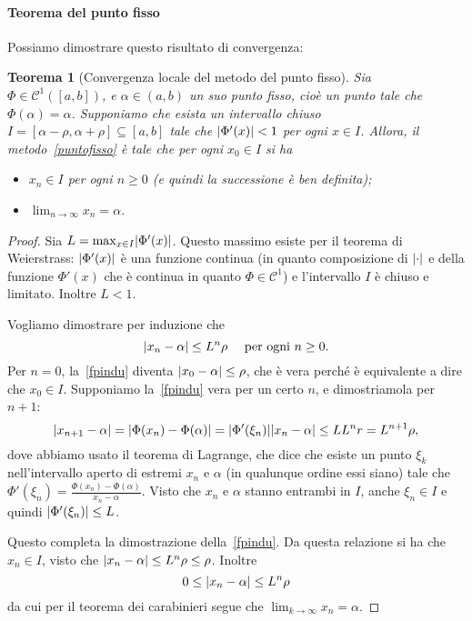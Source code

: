 \documentclass[a4paper]{report}
\DeclarePairedDelimiter{\abs}{\lvert}{\rvert}
\newtheorem{theorem}{Teorema}[chapter]
\theoremstyle{definiton}
\theoremstyle{remark}
\begin{document}
\paragraph{Teorema del punto fisso} Possiamo dimostrare questo risultato di convergenza:
\begin{theorem}[Convergenza locale del metodo del punto fisso] \label{thm:puntofisso}
Sia $\Phi \in \mathcal{C}^1([a,b])$, e $\alpha \in (a,b)$ un suo \emph{punto fisso}, cioè un punto tale che $\Phi(\alpha) = \alpha$. Supponiamo che esista un intervallo chiuso $I = [\alpha-\rho, \alpha+\rho] \subseteq [a,b]$ tale che $\abs{\Phi'(x)} < 1$ per ogni $x \in I$. Allora, il metodo~\eqref{puntofisso} è tale che per ogni $x_0 \in I$ si ha
\begin{itemize}
    \item $x_n \in I$ per ogni $n \geq 0$ (e quindi la successione è ben definita);
    \item $\lim_{n\to\infty} x_n = \alpha$.
\end{itemize}
\end{theorem}


\begin{proof}
Sia $L = \max_{x\in I} \abs{\Phi'(x)}$. Questo massimo esiste per il teorema di Weierstrass: $\abs{\Phi'(x)}$ è una funzione continua (in quanto composizione di $\abs{\cdot}$ e della funzione $\Phi'(x)$ che è continua in quanto $\Phi \in \mathcal{C}^1$) e l'intervallo $I$ è chiuso e limitato. Inoltre $L<1$.

Vogliamo dimostrare per induzione che 
\begin{equation} \label{fpindu}
    \abs{x_n - \alpha} \leq L^n \rho \quad \text{ per ogni $n \geq 0$}.    
\end{equation}
Per $n=0$, la~\eqref{fpindu} diventa $\abs{x_0 - \alpha} \leq \rho$, che è vera perché è equivalente a dire che $x_0 \in I$. Supponiamo la~\eqref{fpindu} vera per un certo $n$, e dimostriamola per $n+1$:
\begin{equation} \label{fpindu2}
    \abs{x_{n+1} - \alpha} = \abs{\Phi(x_n) - \Phi(\alpha)} = \abs{\Phi'(\xi_n)} \abs{x_n - \alpha} \leq L L^n r = L^{n+1}\rho,    
\end{equation}
dove abbiamo usato il teorema di Lagrange, che dice che esiste un punto $\xi_k$ nell'intervallo aperto di estremi $x_n$ e $\alpha$ (in qualunque ordine essi siano) tale che $\Phi'(\xi_n) = \frac{\Phi(x_n) - \Phi(\alpha)}{x_n - \alpha}$. Visto che $x_n$ e $\alpha$ stanno entrambi in $I$, anche $\xi_n \in I$ e quindi $\abs{\Phi'(\xi_n)} \leq L$. 

Questo completa la dimostrazione della~\eqref{fpindu}. Da questa relazione si ha che $x_n \in I$, visto che $\abs{x_n - \alpha} \leq L^n \rho \leq \rho$. Inoltre
\[
0 \leq \abs{x_n - \alpha} \leq L^n \rho
\]
da cui per il teorema dei carabinieri segue che $\lim_{k\to \infty} x_n = \alpha$.
\end{proof}
\end{document}
